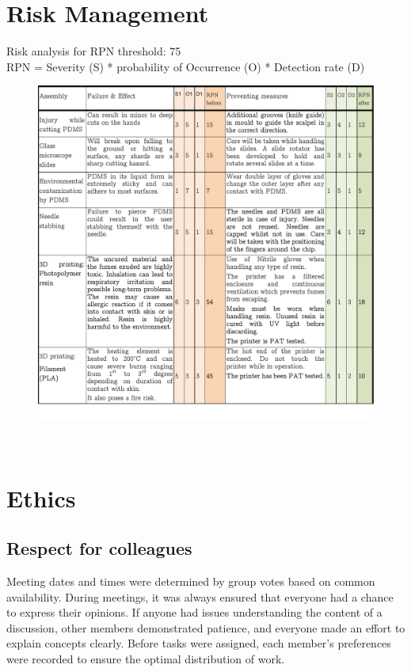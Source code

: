\documentclass[letterpaper,12pt]{article}
\begin{document}
\section{Risk Management} \label{risk management}
Risk analysis for RPN threshold: 75\\
RPN = Severity (S) * probability of Occurrence (O) * Detection rate (D)
~
\begin{figure}[!h]
    \centering
    \includegraphics[width=1\linewidth]{PDF/our_risks.pdf}
    \label{fig:our_risks}
\end{figure}
 ~

\newpage

\section{Ethics} \label{ethics}


\subsection*{Respect for colleagues}

Meeting dates and times were determined by group votes based on common availability. During meetings, it was always ensured that everyone had a chance to express their opinions. If anyone had issues understanding the content of a discussion, other members demonstrated patience, and everyone made an effort to explain concepts clearly. Before tasks were assigned, each member’s preferences were recorded to ensure the optimal distribution of work.
\end{document}
